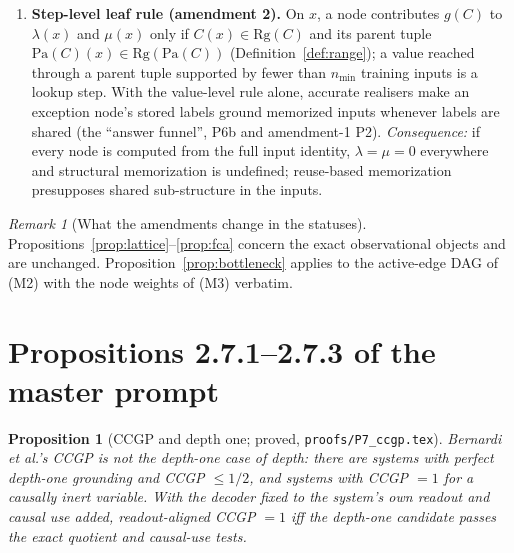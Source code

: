 \documentclass[11pt]{article}
\theoremstyle{definition}
\theoremstyle{plain}
\newtheorem{proposition}[definition]{Proposition}
\theoremstyle{remark}
\newtheorem{remark}[definition]{Remark}
\newcommand{\pa}{\mathrm{Pa}}
\newcommand{\G}{\mathcal{G}}
\begin{document}
\begin{enumerate}[label=(M\arabic*)]
and a function of it (positivity fails, Remark 2.7), every interchange on the
node produces a parent tuple never seen observationally, and $F_{\G}$ is
undefined there. Derivation maps $\psi_C$ are therefore fitted on the
observational tuples together with the tuples produced by the direct-effect
interventions of M1 (the patched parent at its source value, the others
clean or held). IIA is evaluated on fresh pairs; agreement at a tuple reached
both ways is the modularity condition of Proposition~\ref{prop:unseen}(b).
\item \textbf{Step-level leaf rule (amendment 2).} On $x$, a node contributes
$g(C)$ to $\lambda(x)$ and $\mu(x)$ only if $C(x)\in\mathrm{Rg}(C)$ and its parent
tuple $\pa(C)(x)\in\mathrm{Rg}(\pa(C))$ (Definition~\ref{def:range}); a value reached
through a parent tuple supported by fewer than $n_{\min}$ training inputs is a
lookup step. With the value-level rule alone, accurate realisers make an
exception node's stored labels ground memorized inputs whenever labels are
shared (the ``answer funnel'', P6b and amendment-1 P2). \emph{Consequence:} if
every node is computed from the full input identity, $\lambda=\mu=0$ everywhere
and structural memorization is undefined; reuse-based memorization presupposes
shared sub-structure in the inputs.
\end{enumerate}

\begin{remark}[What the amendments change in the statuses]
Propositions~\ref{prop:lattice}--\ref{prop:fca} concern the exact
observational objects and are unchanged. Proposition~\ref{prop:bottleneck} applies to
the active-edge DAG of (M2) with the node weights of (M3) verbatim.
\end{remark}

\section{Propositions 2.7.1--2.7.3 of the master prompt}

\begin{proposition}[CCGP and depth one; proved, \texttt{proofs/P7\_ccgp.tex}]
\label{prop:ccgp}
Bernardi et al.'s CCGP is not the depth-one case of depth: there are systems
with perfect depth-one grounding and CCGP $\le1/2$, and systems with CCGP $=1$
for a causally inert variable. With the decoder fixed to the system's own
readout and causal use added, readout-aligned CCGP $=1$ iff the depth-one
candidate passes the exact quotient and causal-use tests.
\end{proposition}
\end{document}
